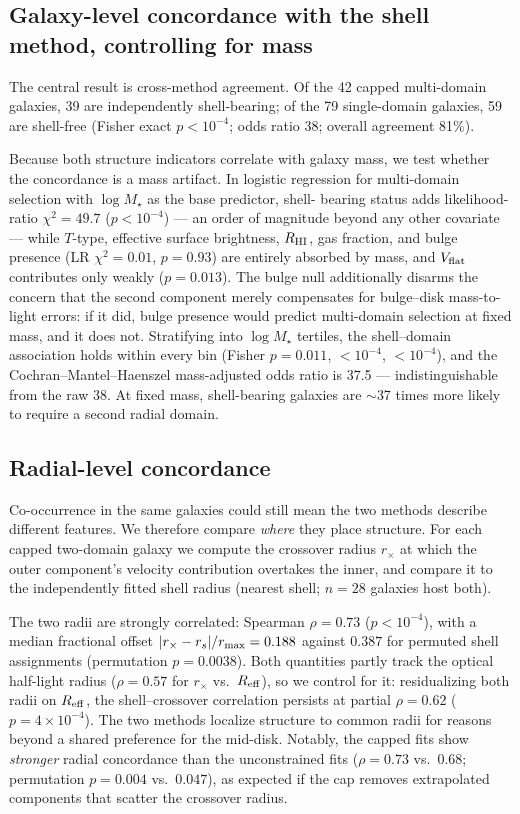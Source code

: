 \documentclass[twocolumn]{aastex631}
\newcommand{\vflat}{V_{\rm flat}}
\newcommand{\reff}{R_{\rm eff}}
\begin{document}
\subsection{Galaxy-level concordance with the shell method, controlling for
mass} \label{sec:concordance}

The central result is cross-method agreement. Of the 42 capped multi-domain
galaxies, 39 are independently shell-bearing; of the 79 single-domain
galaxies, 59 are shell-free (Fisher exact $p < 10^{-4}$; odds ratio 38;
overall agreement 81\%).

Because both structure indicators correlate with galaxy mass, we test
whether the concordance is a mass artifact. In logistic regression for
multi-domain selection with $\log M_\star$ as the base predictor, shell-%
bearing status adds likelihood-ratio $\chi^2 = 49.7$ ($p < 10^{-4}$) ---
an order of magnitude beyond any other covariate --- while $T$-type,
effective surface brightness, $R_{\rm HI}$, gas fraction, and bulge presence
(LR $\chi^2 = 0.01$, $p = 0.93$) are entirely absorbed by mass, and
$\vflat$ contributes only weakly ($p = 0.013$). The bulge null additionally
disarms the concern that the second component merely compensates for
bulge--disk mass-to-light errors: if it did, bulge presence would predict
multi-domain selection at fixed mass, and it does not. Stratifying into $\log M_\star$ tertiles, the shell--domain
association holds within every bin (Fisher $p = 0.011$, $<10^{-4}$,
$<10^{-4}$), and the Cochran--Mantel--Haenszel mass-adjusted odds ratio is
37.5 --- indistinguishable from the raw 38. At fixed mass, shell-bearing
galaxies are $\sim$37 times more likely to require a second radial domain.

\subsection{Radial-level concordance} \label{sec:radial}

Co-occurrence in the same galaxies could still mean the two methods describe
different features. We therefore compare \emph{where} they place structure.
For each capped two-domain galaxy we compute the crossover radius
$r_\times$ at which the outer component's velocity contribution overtakes the
inner, and compare it to the independently fitted shell radius (nearest
shell; $n = 28$ galaxies host both).

The two radii are strongly correlated: Spearman $\rho = 0.73$
($p < 10^{-4}$), with a median fractional offset
$|r_\times - r_s|/r_{\rm max} = 0.188$ against $0.387$ for permuted shell
assignments (permutation $p = 0.0038$). Both quantities partly track the
optical half-light radius ($\rho = 0.57$ for $r_\times$ vs.\ $\reff$), so we
control for it: residualizing both radii on $\reff$, the shell--crossover
correlation persists at partial $\rho = 0.62$ ($p = 4 \times 10^{-4}$). The
two methods localize structure to common radii for reasons beyond a shared
preference for the mid-disk. Notably, the capped fits show \emph{stronger}
radial concordance than the unconstrained fits ($\rho = 0.73$ vs.\ $0.68$;
permutation $p = 0.004$ vs.\ $0.047$), as expected if the cap removes
extrapolated components that scatter the crossover radius.
\end{document}
